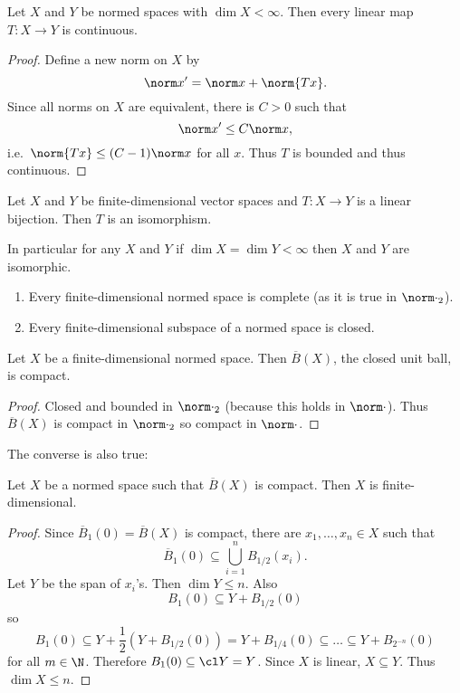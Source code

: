 \documentclass[a4paper]{article}
\begin{document}
\begin{corollary}
  Let \(X\) and \(Y\) be normed spaces with \(\dim X < \infty\). Then every linear map \(T: X \to Y\) is continuous.
\end{corollary}

\begin{proof}
  Define a new norm on \(X\) by
  \[
    \norm x' = \norm x + \norm{T x}.
  \]
  Since all norms on \(X\) are equivalent, there is \(C > 0\) such that
  \[
    \norm x' \leq C \norm x,
  \]
  i.e.\ \(\norm{T x} \leq (C - 1) \norm x\) for all \(x\). Thus \(T\) is bounded and thus continuous.
\end{proof}

\begin{corollary}
  Let \(X\) and \(Y\) be finite-dimensional vector spaces and \(T: X \to Y\) is a linear bijection. Then \(T\) is an isomorphism.

  In particular for any \(X\) and \(Y\) if \(\dim X = \dim Y < \infty\) then \(X\) and \(Y\) are isomorphic.
\end{corollary}

\begin{corollary}\leavevmode
  \begin{enumerate}
  \item Every finite-dimensional normed space is complete (as it is true in \(\norm \cdot_2\)).
  \item Every finite-dimensional subspace of a normed space is closed.
  \end{enumerate}
\end{corollary}

\begin{corollary}
  Let \(X\) be a finite-dimensional normed space. Then \(\overline B(X)\), the closed unit ball, is compact.
\end{corollary}

\begin{proof}
  Closed and bounded in \(\norm \cdot_2\) (because this holds in \(\norm \cdot\)). Thus \(\overline B(X)\) is compact in \(\norm \cdot_2\) so compact in \(\norm \cdot\).
\end{proof}

The converse is also true:
\begin{theorem}
  Let \(X\) be a normed space such that \(\overline B(X)\) is compact. Then \(X\) is finite-dimensional.
\end{theorem}

\begin{proof}
  Since \(\overline B_1(0) = \overline B(X)\) is compact, there are \(x_1, \dots, x_n \in X\) such that
  \[
    \overline B_1(0) \subseteq \bigcup_{i = 1}^n B_{1/2}(x_i).
  \]
  Let \(Y\) be the span of \(x_i\)'s. Then \(\dim Y \leq n\). Also
  \[
    B_1(0) \subseteq Y + B_{1/2}(0)
  \]
  so
  \[
    B_1(0) \subseteq Y + \frac{1}{2} (Y + B_{1/2}(0))
    = Y + B_{1/4}(0)
    \subseteq \dots
    \subseteq Y + B_{2^{-n}}(0)
  \]
  for all \(m \in \N\). Therefore \(B_1(0) \subseteq \cl Y = Y\). Since \(X\) is linear, \(X \subseteq Y\). Thus \(\dim X \leq n\).
\end{proof}
\end{document}
